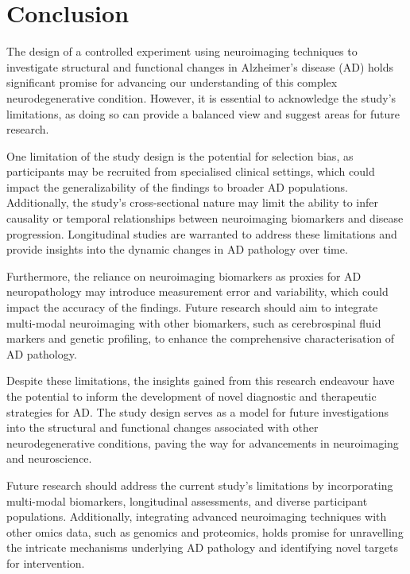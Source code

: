 \documentclass[10pt]{article}
\begin{document}
\begin{sloppypar}
  \section{Conclusion}
  \label{sec:conclusion}

  The design of a controlled experiment using neuroimaging techniques to investigate structural and functional changes in Alzheimer's disease (AD) holds significant promise for advancing our understanding of this complex neurodegenerative condition. However, it is essential to acknowledge the study's limitations, as doing so can provide a balanced view and suggest areas for future research.

  One limitation of the study design is the potential for selection bias, as participants may be recruited from specialised clinical settings, which could impact the generalizability of the findings to broader AD populations. Additionally, the study's cross-sectional nature may limit the ability to infer causality or temporal relationships between neuroimaging biomarkers and disease progression. Longitudinal studies are warranted to address these limitations and provide insights into the dynamic changes in AD pathology over time.

  Furthermore, the reliance on neuroimaging biomarkers as proxies for AD neuropathology may introduce measurement error and variability, which could impact the accuracy of the findings. Future research should aim to integrate multi-modal neuroimaging with other biomarkers, such as cerebrospinal fluid markers and genetic profiling, to enhance the comprehensive characterisation of AD pathology.

  Despite these limitations, the insights gained from this research endeavour have the potential to inform the development of novel diagnostic and therapeutic strategies for AD. The study design serves as a model for future investigations into the structural and functional changes associated with other neurodegenerative conditions, paving the way for advancements in neuroimaging and neuroscience.

  Future research should address the current study's limitations by incorporating multi-modal biomarkers, longitudinal assessments, and diverse participant populations. Additionally, integrating advanced neuroimaging techniques with other omics data, such as genomics and proteomics, holds promise for unravelling the intricate mechanisms underlying AD pathology and identifying novel targets for intervention.

  \pagebreak
  \singlespacing %
  
  

\end{sloppypar}
\end{document}
